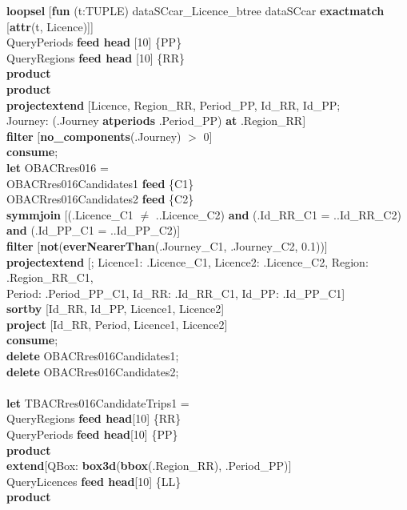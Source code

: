 \documentclass[a4paper]{article}
\newcommand{\op}[1]{\textbf{#1}}
\begin{document}
\begin{scriptsize}
\begin{tabbing}
\>\op{loopsel} [\op{fun} (t:TUPLE) dataSCcar\_Licence\_btree dataSCcar \op{exactmatch} [\op{attr}(t, Licence)]]\\
\>\>QueryPeriods \op{feed head} [10] \{PP\}\\
\>\>QueryRegions \op{feed head} [10] \{RR\}\\
\>\>\op{product}\\
\>\op{product}\\
\>\op{projectextend} [Licence, Region\_RR, Period\_PP, Id\_RR, Id\_PP;\\
\>\>\>Journey: (.Journey \op{atperiods} .Period\_PP) \op{at} .Region\_RR]\\
\>\op{filter} [\op{no\_components}(.Journey) $>$ 0]\\
\op{consume};\\
\op{let} OBACRres016 =\\
\>OBACRres016Candidates1 \op{feed} \{C1\}\\
\>OBACRres016Candidates2 \op{feed} \{C2\}\\
\>\op{symmjoin} [(.Licence\_C1 $\neq$ ..Licence\_C2) \op{and} (.Id\_RR\_C1 = ..Id\_RR\_C2) \op{and} (.Id\_PP\_C1 = ..Id\_PP\_C2)]\\
\>\op{filter} [\op{not}(\op{everNearerThan}(.Journey\_C1, .Journey\_C2, 0.1))]\\
\>\op{projectextend} [; Licence1: .Licence\_C1, Licence2: .Licence\_C2, Region: .Region\_RR\_C1,\\
\>\>\>Period: .Period\_PP\_C1, Id\_RR: .Id\_RR\_C1, Id\_PP: .Id\_PP\_C1]\\
\>\op{sortby} [Id\_RR, Id\_PP, Licence1, Licence2]\\
\>\op{project} [Id\_RR, Period, Licence1, Licence2]\\
\op{consume};\\
\op{delete} OBACRres016Candidates1;\\
\op{delete} OBACRres016Candidates2;\\
\\
\op{let} TBACRres016CandidateTrips1 =\\
\>QueryRegions \op{feed head}[10] \{RR\}\\
\>QueryPeriods \op{feed head}[10] \{PP\}\\
\>\op{product}\\
\>\>\op{extend}[QBox: \op{box3d}(\op{bbox}(.Region\_RR), .Period\_PP)]\\
\>QueryLicences \op{feed head}[10] \{LL\}\\
\>\op{product}\\

\end{tabbing}
\end{scriptsize}
\end{document}
